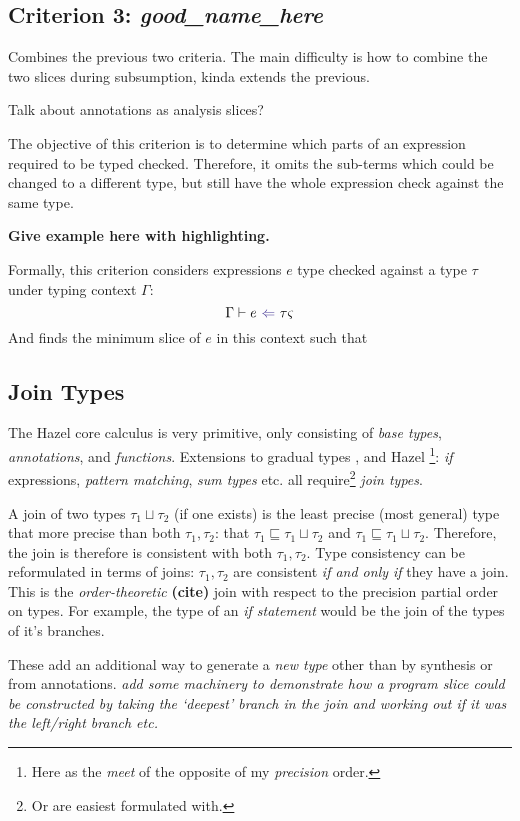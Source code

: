 \subsection{Criterion 3: \textit{good\_name\_here}}
Combines the previous two criteria. The main difficulty is how to combine the two slices during subsumption, kinda extends the previous.

Talk about annotations as analysis slices?

The objective of this criterion is to determine which parts of an expression required to be typed checked. Therefore, it omits the sub-terms which could be changed to a different type, but still have the whole expression check against the same type. 

\textbf{Give example here with highlighting.}

Formally, this criterion considers expressions $e$ type checked against a type $\tau$ under typing context $\Gamma$:
\[\analysis{e}{\tau}{\varsigma}\]
And finds the minimum slice of $e$ in this context such that 

\subsection{Join Types}\label{sec:JoinTypesTheory}
The Hazel core calculus is very primitive, only consisting of \textit{base types}, \textit{annotations}, and \textit{functions}. Extensions to gradual types \cite{GradualJoins}, and Hazel \cite{MarkedLocalisation}\footnote{Here as the \textit{meet} of the opposite of my \textit{precision} order.}: \textit{if} expressions, \textit{pattern matching}, \textit{sum types} etc. all require\footnote{Or are easiest formulated with.} \textit{join types}. 

A join of two types $\tau_1 \sqcup \tau_2$ (if one exists) is the least precise (most general) type that more precise than both $\tau_1, \tau_2$: that $\tau_1 \sqsubseteq \tau_1 \sqcup \tau_2$ and $\tau_1 \sqsubseteq \tau_1 \sqcup \tau_2$. Therefore, the join is therefore is consistent with both $\tau_1, \tau_2$. Type consistency can be reformulated in terms of joins: $\tau_1, \tau_2$ are consistent \textit{if and only if} they have a join. This is the \textit{order-theoretic} \textbf{(cite)} join with respect to the precision partial order on types. 
For example, the type of an \textit{if statement} would be the join of the types of it's branches.

These add an additional way to generate a \textit{new type} other than by synthesis or from annotations.\textit{ add some machinery to demonstrate how a program slice could be constructed by taking the `deepest' branch in the join and working out if it was the left/right branch etc.}

